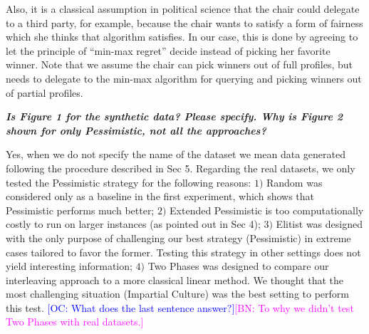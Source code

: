 \documentclass{article}
\newcommand{\commentOC}[1]{\textcolor{blue}{\small$\big[$OC: #1$\big]$}}
\newcommand{\commentBN}[1]{\textcolor{magenta}{\small$\big[$BN: #1$\big]$}}
\begin{document}
Also, it is a classical assumption in political science that the chair could delegate to a third party, for example, because the chair wants to satisfy a form of fairness which she thinks that algorithm satisfies. In our case, this is done by agreeing to let the principle of “min-max regret” decide instead of picking her favorite winner. Note that we assume the chair can pick winners out of full profiles, but needs to delegate to the min-max algorithm for querying and picking winners out of partial profiles.

\textit{\textbf{}}


\textit{\textbf{Is Figure 1 for the synthetic data? Please specify. Why is Figure 2 shown for only Pessimistic, not all the approaches?}}

Yes, when we do not specify the name of the dataset we mean data generated following the procedure described in Sec 5. Regarding the real datasets, we only tested the Pessimistic strategy for the following reasons: $1)$ Random was considered only as a baseline in the first experiment, which shows that Pessimistic performs much better; $2)$ Extended Pessimistic is too computationally costly to run on larger instances (as pointed out in Sec 4); $3)$ Elitist was designed with the only purpose of challenging our best strategy (Pessimistic) in extreme cases tailored to favor the former. Testing this strategy in other settings does not yield interesting information; $4)$ Two Phases was designed to compare our interleaving approach to a more classical linear method. We thought that the most challenging situation (Impartial Culture) was the best setting to perform this test. \commentOC{What does the last sentence answer?}\commentBN{To why we didn't test Two Phases with real datasets.}
\end{document}
